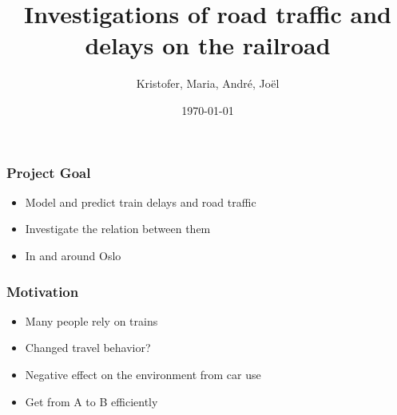 \documentclass{beamer}
\title[Project in STK-INF4000.]{Investigations of road traffic and delays on the railroad}
\author{Kristofer, Maria, Andr\'{e}, Jo\"{e}l}
\institute[UiO]{University of Oslo\medskip}
\date{\today}
\begin{document}
\begin{frame}
\titlepage
\end{frame}


\begin{frame}
\frametitle{Project Goal}
\begin{itemize}
\item Model and predict train delays and road traffic
\item Investigate the relation between them 
\item In and around Oslo
\end{itemize}
\end{frame}




\begin{frame}
\frametitle{Motivation}
\begin{itemize}
\item  Many  people rely on trains
\item  Changed travel behavior?
\item  Negative effect on the environment from car use 
\item Get from A to B efficiently 
\end{itemize}


\end{frame}
\end{document}
